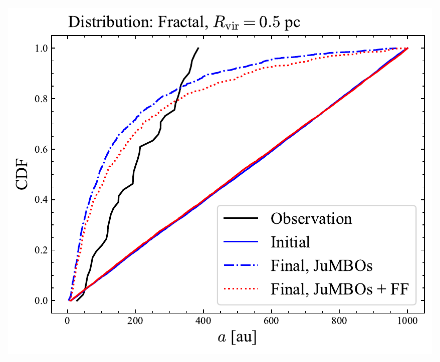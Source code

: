 \documentclass[aa]{lib/aa}
\begin{document}
\begin{figure}
    \centering
        \includegraphics[width=.91\columnwidth]{figures/sem_axis_Fractal_FF.pdf}
        \caption{}
         \label{Fig:Fr_semimajor_axis}
\end{figure}
\end{document}

